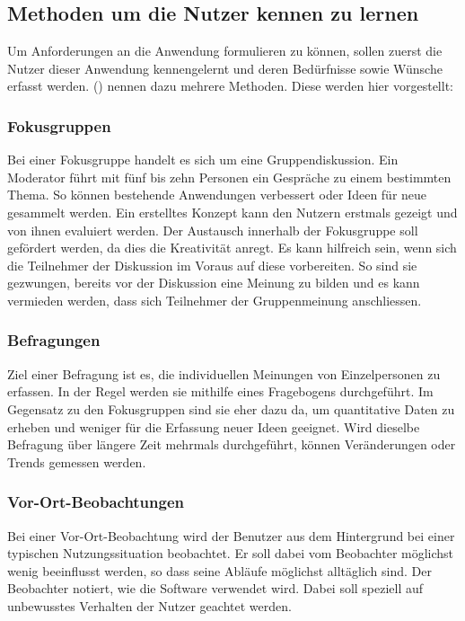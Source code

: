 \subsection{Methoden um die Nutzer kennen zu lernen}
Um Anforderungen an die Anwendung formulieren zu können, sollen zuerst die Nutzer dieser Anwendung kennengelernt und deren Bedürfnisse sowie Wünsche erfasst werden.
\citeauthor{usability} (\citeyear{usability}) nennen dazu mehrere Methoden.
Diese werden hier vorgestellt:

\subsubsection{Fokusgruppen}\label{fokusgruppe}
Bei einer Fokusgruppe handelt es sich um eine Gruppendiskussion.
Ein Moderator führt mit fünf bis zehn Personen ein Gespräche zu einem bestimmten Thema.
So können bestehende Anwendungen verbessert oder Ideen für neue gesammelt werden.
Ein erstelltes Konzept kann den Nutzern erstmals gezeigt und von ihnen evaluiert werden.
Der Austausch innerhalb der Fokusgruppe soll gefördert werden, da dies die Kreativität anregt.
Es kann hilfreich sein, wenn sich die Teilnehmer der Diskussion im Voraus auf diese vorbereiten.
So sind sie gezwungen, bereits vor der Diskussion eine Meinung zu bilden und es kann vermieden werden, dass sich Teilnehmer der Gruppenmeinung anschliessen.


\subsubsection{Befragungen}\label{befragung}
Ziel einer Befragung ist es, die individuellen Meinungen von Einzelpersonen zu erfassen.
In der Regel werden sie mithilfe eines Fragebogens durchgeführt.
Im Gegensatz zu den Fokusgruppen sind sie eher dazu da, um quantitative Daten zu erheben und weniger für die Erfassung neuer Ideen geeignet.
Wird dieselbe Befragung über längere Zeit mehrmals durchgeführt, können Veränderungen oder Trends gemessen werden.


\subsubsection{Vor-Ort-Beobachtungen}\label{vorort}
Bei einer Vor-Ort-Beobachtung wird der Benutzer aus dem Hintergrund bei einer typischen Nutzungssituation beobachtet.
Er soll dabei vom Beobachter möglichst wenig beeinflusst werden, so dass seine Abläufe möglichst alltäglich sind.
Der Beobachter notiert, wie die Software verwendet wird.
Dabei soll speziell auf unbewusstes Verhalten der Nutzer geachtet werden.


